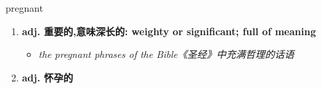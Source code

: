 
\begin{frame}
{\huge pregnant}
\begin{center}
\begin{enumerate}\Large
  \item \textbf{adj. 重要的,意味深长的: weighty or significant; full of meaning}
  \begin{itemize}
    \item \em{\Large{the pregnant phrases of the Bible《圣经》中充满哲理的话语}}
  \end{itemize}
  \item \textbf{adj. 怀孕的}
\end{enumerate}
\end{center}
\end{frame}
